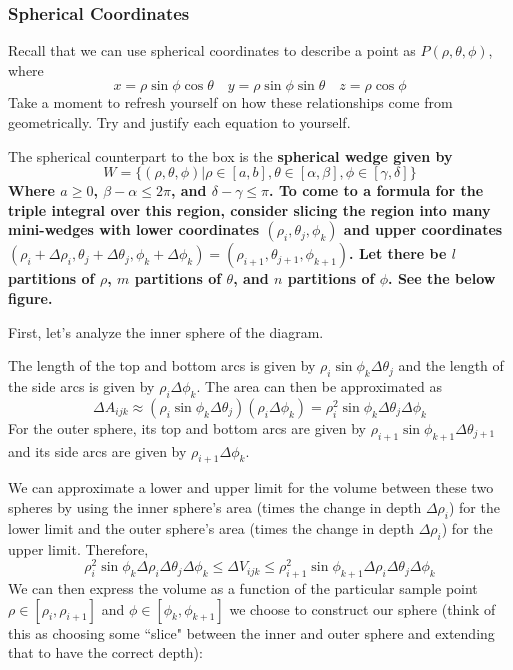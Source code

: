 \subsubsection{Spherical Coordinates}
Recall that we can use spherical coordinates to describe a point as $P(\rho, \theta, \phi)$, where 
\[ x = \rho \sin\phi \cos\theta \quad y = \rho \sin\phi\sin\theta \quad z = \rho\cos\phi \]
Take a moment to refresh yourself on how these relationships come from geometrically. Try and justify each equation to yourself.
 \par
The spherical counterpart to the box is the \bf{spherical wedge} given by
\[ W = \{(\rho, \theta, \phi)| \rho\in[a,b], \theta\in[\alpha, \beta], \phi\in[\gamma, \delta] \}\]
Where $a \geq 0$, $\beta - \alpha \leq 2\pi$, and $\delta - \gamma \leq \pi$.  \newpage
To come to a formula for the triple integral over this region, consider slicing the region into many mini-wedges with lower coordinates $(\rho_i, \theta_j, \phi_k)$ and upper coordinates $(\rho_i + \Delta \rho_i, \theta_j+\Delta \theta_j, \phi_k+\Delta \phi_k) = (\rho_{i+1}, \theta_{j+1}, \phi_{k+1})$. Let there be $l$ partitions of $\rho$, $m$ partitions of $\theta$, and $n$ partitions of $\phi$. See the below figure.
 \par
First, let's analyze the inner sphere of the diagram. \par
The length of the top and bottom arcs is given by $\rho_i\sin\phi_k \Delta\theta_j$ and the length of the side arcs is given by $\rho_i\Delta \phi_k$. The area can then be approximated as
\[ \Delta A_{ijk} \approx (\rho_i\sin\phi_k \Delta\theta_j)(\rho_i\Delta \phi_k) = \rho_i^2 \sin \phi_k \Delta \theta_j\Delta \phi_k \]
For the outer sphere, its top and bottom arcs are given by $\rho_{i+1}\sin \phi_{k+1}\Delta \theta_{j+1}$ and its side arcs are given by $\rho_{i+1}\Delta \phi_k$. \par We can approximate a lower and upper limit for the volume between these two spheres by using the inner sphere's area (times the change in depth $\Delta \rho_i$) for the lower limit and the outer sphere's area (times the change in depth $\Delta \rho_i$) for the upper limit. Therefore,
\[ \rho_i^2 \sin \phi_k \Delta \rho_i\Delta \theta_j \Delta \phi_k \leq \Delta V_{ijk} \leq \rho_{i+1}^2 \sin \phi_{k+1} \Delta \rho_i\Delta \theta_j \Delta \phi_k \]
We can then express the volume as a function of the particular sample point $\rho\in[\rho_i, \rho_{i+1}]$ and $\phi\in[\phi_k, \phi_{k+1}]$ we choose to construct our sphere (think of this as choosing some ``slice" between the inner and outer sphere and extending that to have the correct depth):
